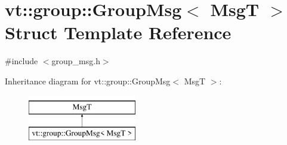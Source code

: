 \hypertarget{structvt_1_1group_1_1_group_msg}{}\section{vt\+:\+:group\+:\+:Group\+Msg$<$ MsgT $>$ Struct Template Reference}
\label{structvt_1_1group_1_1_group_msg}


{\ttfamily \#include $<$group\+\_\+msg.\+h$>$}

Inheritance diagram for vt\+:\+:group\+:\+:Group\+Msg$<$ MsgT $>$\+:\begin{figure}[H]
\begin{center}
\leavevmode
\includegraphics[height=2.000000cm]{structvt_1_1group_1_1_group_msg}
\end{center}
\end{figure}
